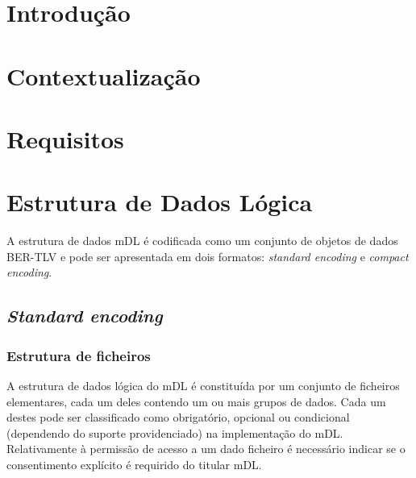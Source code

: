 \documentclass[11pt]{article}
\begin{document}
\tableofcontents

\newpage



\section{Introdução}


\section{Contextualização}


\section{Requisitos}


\section{Estrutura de Dados Lógica}

A estrutura de dados mDL é codificada como um conjunto de objetos de dados BER-TLV e pode ser apresentada em dois formatos: \textit{standard encoding} e \textit{compact encoding}.

\subsection{\textit{Standard encoding}}


\subsubsection{Estrutura de ficheiros}

A estrutura de dados lógica do mDL é constituída por um conjunto de ficheiros elementares, cada um deles contendo um ou mais grupos de dados. Cada um destes pode ser classificado como obrigatório, opcional ou condicional (dependendo do suporte providenciado) na implementação do mDL. Relativamente à permissão de acesso a um dado ficheiro é necessário indicar se o consentimento explícito é requirido do titular mDL.
\end{document}
